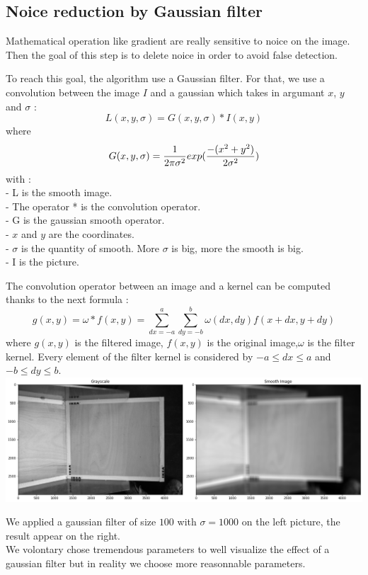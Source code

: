 \documentclass{article}
\begin{document}
\subsection{Noice reduction by Gaussian filter}
Mathematical operation like gradient are really sensitive to noice on the image. Then the goal of this step is to delete noice in order to avoid false detection.

To reach this goal, the algorithm use a Gaussian filter. 
For that, we use a convolution between the image $I$ and a gaussian which takes in argumant $x$, $y$ and $\sigma$ :
 $$L(x , y , \sigma) = G(x , y , \sigma) * I (x , y )$$
where
 $$ G(x , y , \sigma) = \frac{1}{2\pi \sigma^2}exp(\frac{-(x^2+y^2)}{2\sigma^2}) \\$$
 with :\\
 - L is the smooth image.\\
 - The operator * is the convolution operator.\\
 - G is the gaussian smooth operator.\\
 - $x$ and $y$ are the coordinates.\\
 - $\sigma$ is the quantity of smooth. More $\sigma$ is big, more the smooth is big.\\
 - I is the picture.\\
\vspace{1 cm}

The convolution operator between an image and a kernel can be computed thanks to the next formula :
$$ g(x, y) = \omega * f(x, y) = \sum_{dx = -a}^a \sum_{dy = -b}^b \omega(dx, dy) f(x+dx, y+dy) $$
where $g(x,y)$ is the filtered image, $f(x,y)$ is the original image,$\omega$  is the filter kernel. Every element of the filter kernel is considered by $-a \leq dx \leq a$ and $-b \leq dy \leq b$.\\

\includegraphics[width=14cm]{images/img5.png} 

We applied a gaussian filter of size $100$ with $\sigma = 1000$ on the left picture, the result appear on the right.\\
We volontary chose tremendous parameters to well visualize the effect of a gaussian filter but in reality we choose more reasonnable parameters.
\end{document}
